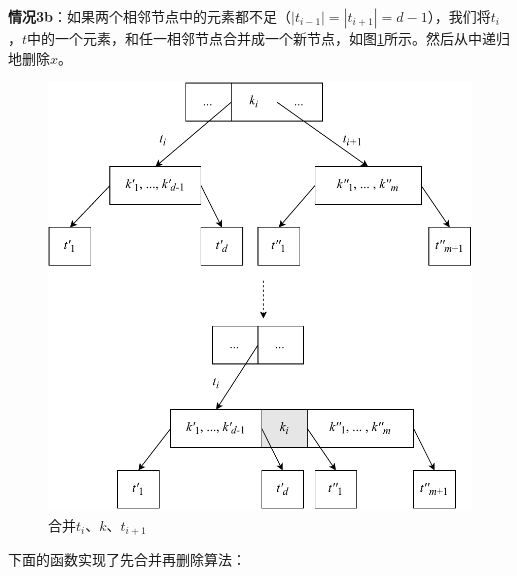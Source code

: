 \documentclass[b5paper]{ctexart}
\begin{document}
\textbf{情况3b}：如果两个相邻节点中的元素都不足（$|t_{i-1}| = |t_{i+1}| = d - 1$），我们将$t_i$，$t$中的一个元素，和任一相邻节点合并成一个新节点，如图\cref{fig:btree-del-merge-subtree}所示。然后从中递归地删除$x$。

\begin{figure}[htbp]
  \centering
  \includegraphics[scale=0.65]{img/btree-del-merge-subtree}
  \caption{合并$t_i$、$k$、$t_{i+1}$}
  \label{fig:btree-del-merge-subtree}
\end{figure}

下面的函数实现了先合并再删除算法：
\end{document}
